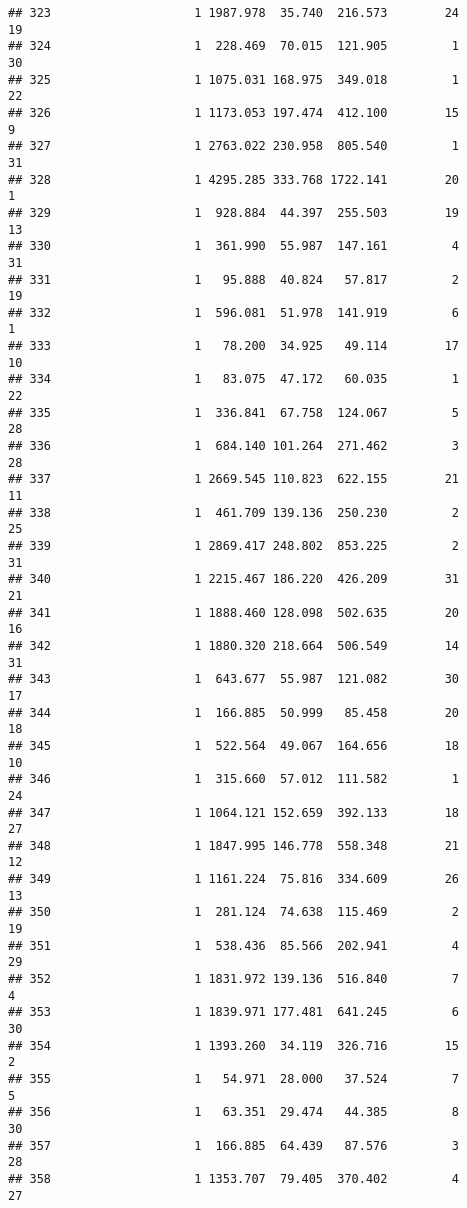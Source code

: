 \documentclass[
]{article}
\begin{document}
\begin{verbatim}
## 323                    1 1987.978  35.740  216.573        24        19
## 324                    1  228.469  70.015  121.905         1        30
## 325                    1 1075.031 168.975  349.018         1        22
## 326                    1 1173.053 197.474  412.100        15         9
## 327                    1 2763.022 230.958  805.540         1        31
## 328                    1 4295.285 333.768 1722.141        20         1
## 329                    1  928.884  44.397  255.503        19        13
## 330                    1  361.990  55.987  147.161         4        31
## 331                    1   95.888  40.824   57.817         2        19
## 332                    1  596.081  51.978  141.919         6         1
## 333                    1   78.200  34.925   49.114        17        10
## 334                    1   83.075  47.172   60.035         1        22
## 335                    1  336.841  67.758  124.067         5        28
## 336                    1  684.140 101.264  271.462         3        28
## 337                    1 2669.545 110.823  622.155        21        11
## 338                    1  461.709 139.136  250.230         2        25
## 339                    1 2869.417 248.802  853.225         2        31
## 340                    1 2215.467 186.220  426.209        31        21
## 341                    1 1888.460 128.098  502.635        20        16
## 342                    1 1880.320 218.664  506.549        14        31
## 343                    1  643.677  55.987  121.082        30        17
## 344                    1  166.885  50.999   85.458        20        18
## 345                    1  522.564  49.067  164.656        18        10
## 346                    1  315.660  57.012  111.582         1        24
## 347                    1 1064.121 152.659  392.133        18        27
## 348                    1 1847.995 146.778  558.348        21        12
## 349                    1 1161.224  75.816  334.609        26        13
## 350                    1  281.124  74.638  115.469         2        19
## 351                    1  538.436  85.566  202.941         4        29
## 352                    1 1831.972 139.136  516.840         7         4
## 353                    1 1839.971 177.481  641.245         6        30
## 354                    1 1393.260  34.119  326.716        15         2
## 355                    1   54.971  28.000   37.524         7         5
## 356                    1   63.351  29.474   44.385         8        30
## 357                    1  166.885  64.439   87.576         3        28
## 358                    1 1353.707  79.405  370.402         4        27

\end{verbatim}
\end{document}
